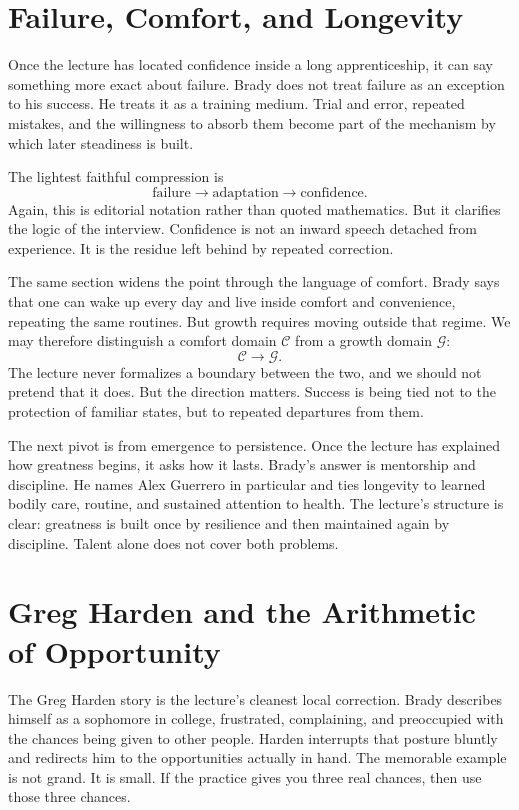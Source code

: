 \section{Failure, Comfort, and Longevity}

Once the lecture has located confidence inside a long apprenticeship, it can say something more exact about failure. Brady does not treat failure as an exception to his success. He treats it as a training medium. Trial and error, repeated mistakes, and the willingness to absorb them become part of the mechanism by which later steadiness is built.

The lightest faithful compression is
\begin{equation}
\text{failure} \to \text{adaptation} \to \text{confidence}.
\end{equation}
Again, this is editorial notation rather than quoted mathematics. But it clarifies the logic of the interview. Confidence is not an inward speech detached from experience. It is the residue left behind by repeated correction.

The same section widens the point through the language of comfort. Brady says that one can wake up every day and live inside comfort and convenience, repeating the same routines. But growth requires moving outside that regime. We may therefore distinguish a comfort domain \(\mathcal C\) from a growth domain \(\mathcal G\):
\begin{equation}
\mathcal C \to \mathcal G.
\end{equation}
The lecture never formalizes a boundary between the two, and we should not pretend that it does. But the direction matters. Success is being tied not to the protection of familiar states, but to repeated departures from them.

The next pivot is from emergence to persistence. Once the lecture has explained how greatness begins, it asks how it lasts. Brady's answer is mentorship and discipline. He names Alex Guerrero in particular and ties longevity to learned bodily care, routine, and sustained attention to health. The lecture's structure is clear: greatness is built once by resilience and then maintained again by discipline. Talent alone does not cover both problems.

\section{Greg Harden and the Arithmetic of Opportunity}

The Greg Harden story is the lecture's cleanest local correction. Brady describes himself as a sophomore in college, frustrated, complaining, and preoccupied with the chances being given to other people. Harden interrupts that posture bluntly and redirects him to the opportunities actually in hand. The memorable example is not grand. It is small. If the practice gives you three real chances, then use those three chances.

